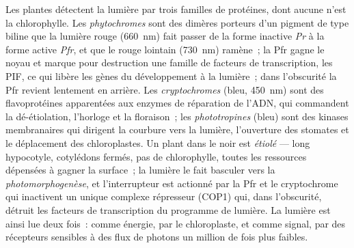 \begin{definition}\label{def:b3:plant-molecular-physiology:photoreceptors}
Les plantes détectent la lumière par trois familles de protéines, dont
aucune n'est la chlorophylle. Les \emph{phytochromes} sont des dimères
porteurs d'un pigment de type biline que la lumière rouge
(\qty{660}{nm}) fait passer de la forme inactive \emph{Pr} à la forme
active \emph{Pfr}, et que le rouge lointain (\qty{730}{nm}) ramène~; la
Pfr gagne le noyau et marque pour destruction une famille de facteurs de
transcription, les PIF, ce qui libère les gènes du développement à la
lumière~; dans l'obscurité la Pfr revient lentement en arrière. Les
\emph{cryptochromes} (bleu, \qty{450}{nm}) sont des flavoprotéines
apparentées aux enzymes de réparation de l'ADN, qui commandent la
dé-étiolation, l'horloge et la floraison~; les \emph{phototropines}
(bleu) sont des kinases membranaires qui dirigent la courbure vers la
lumière, l'ouverture des stomates et le déplacement des chloroplastes.
Un plant dans le noir est \emph{étiolé} --- long hypocotyle, cotylédons
fermés, pas de chlorophylle, toutes les ressources dépensées à gagner la
surface~; la lumière le fait basculer vers la
\emph{photomorphogenèse}, et l'interrupteur est actionné par la Pfr et
le cryptochrome qui inactivent un unique complexe répresseur (COP1) qui,
dans l'obscurité, détruit les facteurs de transcription du programme de
lumière. La lumière est ainsi lue deux fois~: comme énergie, par le
chloroplaste, et comme signal, par des récepteurs sensibles à des flux
de photons un million de fois plus faibles.
\end{definition}


